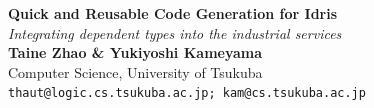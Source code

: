 \documentclass[a1,portrait]{a1poster}
\begin{document}
% 

\begin{minipage}[b]{0.6\linewidth}
\huge \color{DarkRed} \textbf{Quick and Reusable Code Generation for Idris} \color{Black}\\ %
\huge\textit{Integrating dependent types into the industrial services}\\[1cm] %
\large \textbf{Taine Zhao \& Yukiyoshi Kameyama}\\[0.5cm] %
\large Computer Science, University of Tsukuba \\[0.2cm] %
\texttt{thaut@logic.cs.tsukuba.ac.jp; kam@cs.tsukuba.ac.jp}\\
\end{minipage}
%

\vspace{.5cm} %

\end{document}
